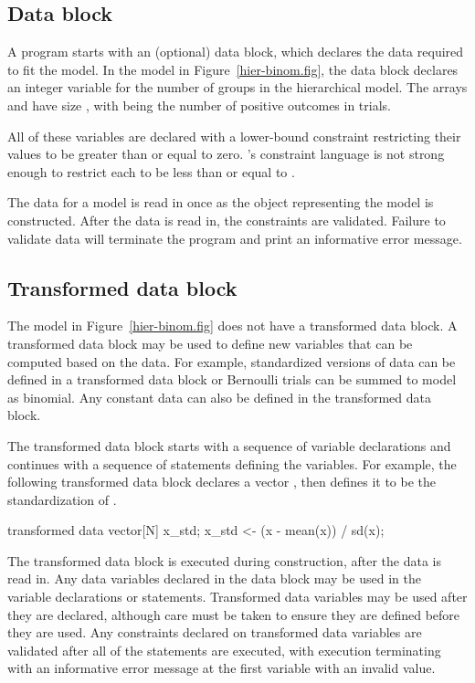 \documentclass[article]{jss}
\begin{document}
\subsection{Data block}

A  program starts with an (optional) data block, which
declares the data required to fit the model.  In the model in
Figure~\ref{hier-binom.fig}, the data block declares an integer
variable  for the number of groups in the hierarchical model.
The arrays  and  have size , with 
being the number of positive outcomes in  trials.  

All of these variables are declared with a lower-bound constraint
restricting their values to be greater than or equal to zero.
's constraint language is not strong enough to restrict
each  to be less than or equal to .

The data for a  model is read in once as the
 object representing the model is constructed.  After
the data is read in, the constraints are validated.  Failure to
validate data will terminate the program and print an informative
error message.

\subsection{Transformed data block}

The model in Figure~\ref{hier-binom.fig} does not have a transformed
data block.  A transformed data block may be used to define new
variables that can be computed based on the data.  For example,
standardized versions of data can be defined in a transformed
data block or Bernoulli trials can be summed to model as binomial.
Any constant data can also be defined in the transformed data block.

The transformed data block starts with a sequence of variable
declarations and continues with a sequence of statements defining the
variables.  For example, the following transformed data block declares
a vector , then defines it to be the standardization of .
%
\begin{Code}
transformed data {
  vector[N] x_std;
  x_std <- (x - mean(x)) / sd(x);
}
\end{Code}

The transformed data block is executed during construction, after the
data is read in.  Any data variables declared in the data block may be
used in the variable declarations or statements.  Transformed data
variables may be used after they are declared, although care must be
taken to ensure they are defined before they are used.  Any
constraints declared on transformed data variables are validated after
all of the statements are executed, with execution terminating with an
informative error message at the first variable with an invalid value.
\end{document}
